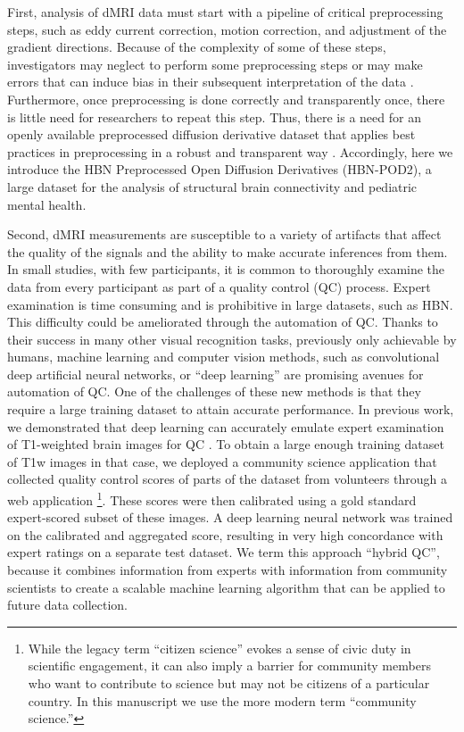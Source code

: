 \documentclass[fleqn,10pt]{wlscirep}
\begin{document}
First, analysis of dMRI data must start with a pipeline of critical
preprocessing steps, such as eddy current correction, motion correction, and
adjustment of the gradient directions. Because of the complexity of some of
these steps, investigators may neglect to perform some preprocessing steps or
may make errors that can induce bias in their subsequent interpretation of the
data \cite{jones2010-ps}. Furthermore, once preprocessing is done correctly and
transparently once, there is little need for researchers to repeat this step.
Thus, there is a need for an openly available preprocessed diffusion derivative
dataset that applies best practices in preprocessing in a robust and transparent
way \cite{cieslak2021-iq}. Accordingly, here we introduce the HBN Preprocessed
Open Diffusion Derivatives (HBN-POD2), a large dataset for the analysis of
structural brain connectivity and pediatric mental health.

Second, dMRI measurements are susceptible to a variety of artifacts that affect
the quality of the signals and the ability to make accurate inferences from them.
In small studies, with few participants, it is common to thoroughly examine the
data from every participant as part of a quality control (QC) process. Expert
examination is time consuming and is prohibitive in large datasets, such as HBN.
This difficulty could be ameliorated through the automation of QC. Thanks to
their success in many other visual recognition tasks, previously only achievable
by humans, machine learning and computer vision methods, such as convolutional
deep artificial neural networks, or ``deep learning'' \cite{lecun2015deep}
are promising avenues for automation of QC. One
of the challenges of these new methods is that they require a large training
dataset to attain accurate performance. In previous work, we demonstrated that
deep learning can accurately emulate expert examination of T1-weighted brain
images for QC \cite{keshavan2019-er}. To obtain a large enough training dataset of
T1w images in that case, we deployed a community science application that
collected quality control scores of parts of the dataset from volunteers through
a web application \footnote{%
    While the legacy term ``citizen science'' evokes a sense of civic duty in
    scientific engagement, it can also imply a barrier for community members who
    want to contribute to science but may not be citizens of a particular
    country.  In this manuscript we use the more modern term ``community
    science.''
}.
These scores were then calibrated using a gold standard expert-scored subset of
these images. A deep learning neural network was trained on the calibrated and
aggregated score, resulting in very high concordance with expert ratings on a
separate test dataset. We term this approach ``hybrid QC'', because it combines
information from experts with information from community scientists to create a
scalable machine learning algorithm that can be applied to future data
collection.
\end{document}
